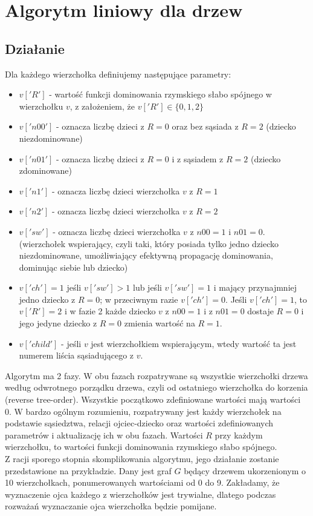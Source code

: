 \section{Algorytm liniowy dla drzew}

\subsection{Działanie}

Dla każdego wierzchołka definiujemy następujące parametry:
\begin{itemize}
    \item $v['R']$ - wartość funkcji dominowania rzymskiego słabo spójnego w wierzchołku $v$, z założeniem, że $v['R']\in\{0,1,2\}$
    \item $v['n00']$ - oznacza liczbę dzieci z $R=0$ oraz bez sąsiada z $R=2$ (dziecko niezdominowane)
    \item $v['n01']$ - oznacza liczbę dzieci z $R=0$ i z sąsiadem z $R=2$ (dziecko zdominowane)
    \item $v['n1']$ - oznacza liczbę dzieci wierzchołka $v$ z $R = 1$
    \item $v['n2']$ - oznacza liczbę dzieci wierzchołka $v$ z $R = 2$
    \item $v['sw']$ - oznacza liczbę dzieci wierzchołka $v$ z $n00=1$ i $n01=0$. (wierzchołek wspierający, czyli taki, który posiada tylko jedno dziecko niezdominowane, umożliwiający efektywną propagację dominowania, dominując siebie lub dziecko)
    \item $v['ch'] =1$ jeśli $v['sw']>1$ lub jeśli $v['sw']=1$ i mający przynajmniej jedno dziecko z $R=0$; w przeciwnym razie $v['ch'] =0$. Jeśli $v['ch'] =1$, to $v['R']=2$ i w fazie 2 każde dziecko $v$ z $n00=1$ i z $n01=0$ dostaje $R=0$ i jego jedyne dziecko z $R=0$ zmienia wartość na $R=1$.
    \item $v['child']$ - jeśli $v$ jest wierzchołkiem wspierającym, wtedy wartość ta jest numerem liścia sąsiadującego z $v$.
\end{itemize}

Algorytm ma 2 fazy. W obu fazach rozpatrywane są wszystkie wierzchołki drzewa według odwrotnego porządku drzewa, czyli od ostatniego wierzchołka do korzenia (reverse tree-order). Wszystkie początkowo zdefiniowane wartości mają wartości 0. W bardzo ogólnym rozumieniu, rozpatrywany jest każdy wierzchołek na podstawie sąsiedztwa, relacji ojciec-dziecko oraz wartości zdefiniowanych parametrów i aktualizację ich w obu fazach. Wartości $R$ przy każdym wierzchołku, to wartości funkcji dominowania rzymskiego słabo spójnego.
\\
Z racji sporego stopnia skomplikowania algorytmu, jego działanie zostanie przedstawione na przykładzie.
Dany jest graf $G$ będący drzewem ukorzenionym o 10 wierzchołkach, ponumerowanych wartościami od 0 do 9. Zakładamy, że wyznaczenie ojca każdego z wierzchołków jest trywialne, dlatego podczas rozważań wyznaczanie ojca wierzchołka będzie pomijane.

